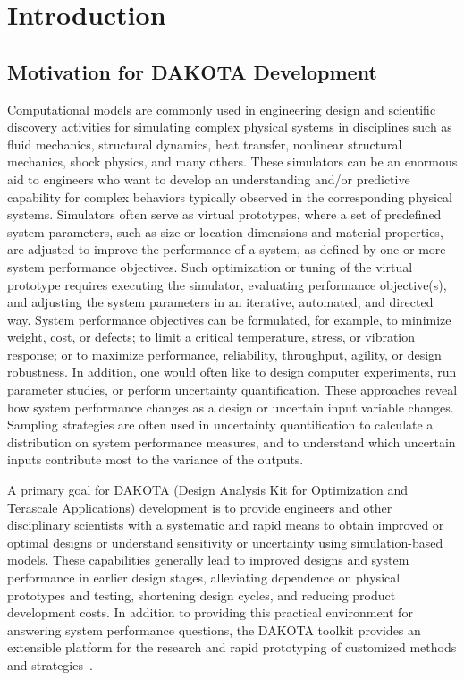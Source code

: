 \chapter{Introduction}\label{introduction}

\section{Motivation for DAKOTA Development}\label{introduction:motivation}

Computational models are commonly used in engineering design and
scientific discovery activities for simulating complex physical
systems in disciplines such as fluid mechanics, structural dynamics,
heat transfer, nonlinear structural mechanics, shock physics, and many
others. These simulators can be an enormous aid to engineers who want
to develop an understanding and/or predictive capability for complex
behaviors typically observed in the corresponding physical
systems. Simulators often serve as virtual prototypes, where a set of
predefined system parameters, such as size or location dimensions and
material properties, are adjusted to improve the performance of a
system, as defined by one or more system performance objectives. Such
optimization or tuning of the virtual prototype requires executing the
simulator, evaluating performance objective(s), and adjusting the
system parameters in an iterative, automated, and directed way. System
performance objectives can be formulated, for example, to minimize
weight, cost, or defects; to limit a critical temperature, stress, or
vibration response; or to maximize performance, reliability,
throughput, agility, or design robustness.  In addition, one would
often like to design computer experiments, run parameter studies, or
perform uncertainty quantification. These approaches reveal how system
performance changes as a design or uncertain input variable changes.
Sampling strategies are often used in uncertainty quantification to
calculate a distribution on system performance measures, and to
understand which uncertain inputs contribute most to the variance of
the outputs.

A primary goal for DAKOTA (Design Analysis Kit for Optimization and
Terascale Applications) development is to provide engineers and other
disciplinary scientists with a systematic and rapid means to obtain
improved or optimal designs or understand sensitivity or uncertainty
using simulation-based models. These capabilities generally lead to
improved designs and system performance in earlier design stages,
alleviating dependence on physical prototypes and testing, shortening
design cycles, and reducing product development costs. In addition to
providing this practical environment for answering system performance
questions, the DAKOTA toolkit provides an extensible platform for the
research and rapid prototyping of customized methods and
strategies~\cite{Eld98b}.

